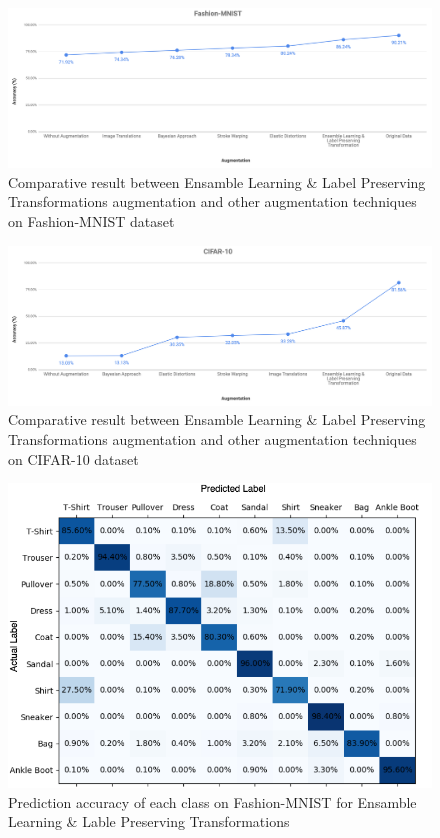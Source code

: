 \begin{figure}
  \centering
  \label{fig:Fashion_MNIST_ensamble_result}
  \includegraphics[width=1\textwidth]{fig/contribution/fashion-mnist-ensamble-result}
  \caption{Comparative result between Ensamble Learning \& Label Preserving Transformations augmentation and other augmentation techniques on Fashion-MNIST dataset}
\end{figure}


\begin{figure}
  \centering
  \label{fig:Cifar_10_ensamble_result}
  \includegraphics[width=1\textwidth]{fig/contribution/cifar-10-ensamble-result}
  \caption{Comparative result between Ensamble Learning \& Label Preserving Transformations augmentation and other augmentation techniques on CIFAR-10 dataset}
\end{figure}

\begin{figure}
  \centering
  \label{fig:Fashion_MNIST_Ensamble_Heatmaps}
  \includegraphics[width=1\textwidth]{fig/contribution/Fashion_MNIST_Ensamble}
  \caption{Prediction accuracy of each class on Fashion-MNIST for Ensamble Learning \& Lable Preserving Transformations}
\end{figure}